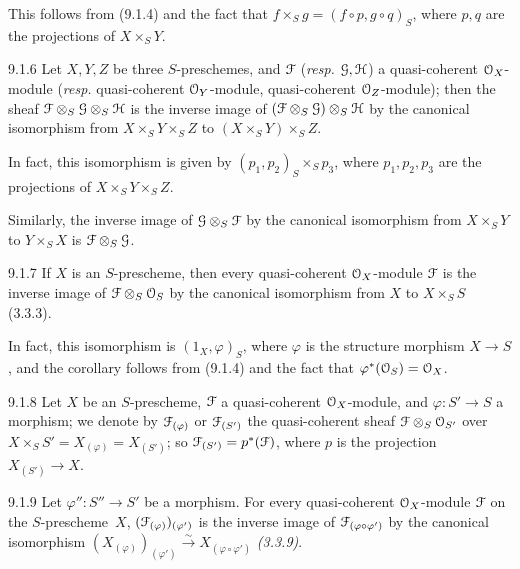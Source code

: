 \documentclass[../main.tex]{subfiles}
\begin{document}
This follows from (9.1.4) and the fact that $f\times_S g=(f\circ p, g\circ q)_S$, where $p,q$ are the projections of $X\times_S Y$.

\begin{cx}[Corollary]{9.1.6}
    Let $X,Y,Z$ be three $S$-preschemes, and $\mathcal{F}$ (\emph{resp.} $\mathcal{G},\mathcal{H}$) a quasi-coherent $\mathcal{O}_X$-module (\emph{resp.} quasi-coherent $\mathcal{O}_Y$-module, quasi-coherent $\mathcal{O}_Z$-module); then the sheaf $\mathcal{F}\otimes_S\mathcal{G}\otimes_S\mathcal{H}$ is the inverse image of $(\mathcal{F}\otimes_S\mathcal{G})\otimes_S\mathcal{H}$ by the canonical isomorphism from $X\times_S Y\times_S Z$ to $(X\times_S Y)\times_S Z$.
\end{cx}

In fact, this isomorphism is given by $(p_1,p_2)_S\times_S p_3$, where $p_1,p_2,p_3$ are the projections of $X\times_S Y\times_S Z$.

Similarly, the inverse image of $\mathcal{G}\otimes_S\mathcal{F}$ by the canonical isomorphism from $X\times_S Y$ to $Y\times_S X$ is $\mathcal{F}\otimes_S\mathcal{G}$.

\begin{cx}[Corollary]{9.1.7}
    If $X$ is an $S$-prescheme, then every quasi-coherent $\mathcal{O}_X$-module $\mathcal{F}$ is the inverse image of $\mathcal{F}\otimes_S\mathcal{O}_S$ by the canonical isomorphism from $X$ to $X\times_S S$ (3.3.3).
\end{cx}

In fact, this isomorphism is $(1_X,\varphi)_S$, where $\varphi$ is the structure morphism $X\to S$, and the corollary follows from (9.1.4) and the fact that $\varphi^*(\mathcal{O}_S)=\mathcal{O}_X$.

\begin{cx}{9.1.8}
    Let $X$ be an $S$-prescheme, $\mathcal{F}$ a quasi-coherent $\mathcal{O}_X$-module, and $\varphi\colon S'\to S$ a morphism; we denote by $\mathcal{F}_{(\varphi)}$ or $\mathcal{F}_{(S')}$ the quasi-coherent sheaf $\mathcal{F}\otimes_S\mathcal{O}_{S'}$ over $X\times_S S'=X_{(\varphi)}=X_{(S')}$; so $\mathcal{F}_{(S')}=p^*(\mathcal{F})$, where $p$ is the projection $X_{(S')}\to X$.
\end{cx}

\begin{cx}[Proposition]{9.1.9}
    Let $\varphi''\colon S''\to S'$ be a morphism.
    For every quasi-coherent $\mathcal{O}_X$-module $\mathcal{F}$ on the $S$-prescheme~$X$, $(\mathcal{F}_{(\varphi)})_{(\varphi')}$ is the inverse image of $\mathcal{F}_{(\varphi\circ\varphi')}$ by the canonical isomorphism $(X_{(\varphi)})_{(\varphi')}\xrightarrow{\sim}X_{(\varphi\circ\varphi')}$ \emph{(3.3.9)}.
\end{cx}
\end{document}
